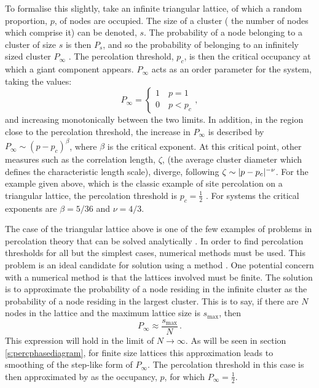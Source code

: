 To formalise this slightly, take an infinite triangular lattice, of which a random proportion, $p$, of nodes are occupied.
The size of a cluster (\ie{} the number of nodes which comprise it) can be denoted, $s$. 
The probability of a node belonging to a cluster of size $s$ is then $P_s$, and so the probability of belonging to an infinitely sized cluster $P_{\infty}$ \cite{StaufferDietrich2014}.
The percolation threshold, $p_c$, is then the critical occupancy at which a giant component appears.
$P_\infty$ acts as an order parameter for the system, taking the values:
\begin{equation}
	P_{\infty}=\begin{cases} 1 \quad p=1 \\
							0 \quad p<p_c
	\end{cases},
\end{equation}
and increasing monotonically between the two limits. 
In addition, in the region close to the percolation threshold, the increase in $P_\infty$ is described by $P_\infty\sim\left(p-p_c\right)^\beta$, where $\beta$ is the critical exponent.
At this critical point, other measures such as the correlation length, $\zeta$, (the average cluster diameter which defines the characteristic length scale), diverge, following $\zeta\sim \lvert p-p_c\rvert^{-\nu}$.
For the example given above, which is the classic example of site percolation on a triangular lattice, the percolation threshold is $p_c=\frac{1}{2}$ \cite{Sykes1964}. For \td{} systems the critical exponents are $\beta=5/36$ and $\nu=4/3$.

The case of the triangular lattice above is one of the few examples of problems in percolation theory that can be solved analytically \cite{Kirkpatrick1973}.
In order to find percolation thresholds for all but the simplest cases, numerical methods must be used.
This problem is an ideal candidate for solution using a \mc{} method \cite{Frisch1962,Dean1967}.
One potential concern with a numerical method is that the lattices involved must be finite.
The solution is to approximate the probability of a node residing in the infinite cluster as the probability of a node residing in the largest cluster. 
This is to say, if there are $N$ nodes in the lattice and the maximum lattice size is $s_{\text{max}}$, then
\begin{equation}
	P_{\infty}\approx \frac{s_\text{max}}{N}\,.
\end{equation} 
This expression will hold in the limit of $N\rightarrow \infty$.
As will be seen in section \ref{s:percphasediagram}, for finite size lattices this approximation leads to smoothing of the step\--like form of $P_{\infty}$.
The percolation threshold in this case is then approximated by as the occupancy, $p$, for which $P_{\infty}=\frac{1}{2}$.

